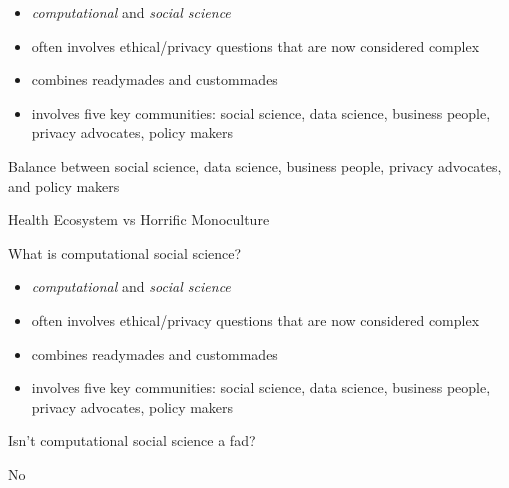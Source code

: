 \documentclass{beamer}
\def\vf{\vfill}
\begin{document}
\begin{frame}

\begin{itemize}
\item \emph{computational} and \emph{social science}
\item often involves ethical/privacy questions that are now considered complex
\item combines readymades and custommades
\pause
\item involves five key communities: social science, data science, business people, privacy advocates, policy makers
\end{itemize}

\end{frame}
\begin{frame}

\begin{center}
Balance between social science, data science, business people, privacy advocates, and policy makers\\
\end{center}
\vf
\begin{center}
Health Ecosystem vs Horrific Monoculture
\end{center}

\end{frame}
\begin{frame}

\begin{center}
\LARGE{What is computational social science?}
\end{center}

\begin{itemize}
\item \emph{computational} and \emph{social science}
\item often involves ethical/privacy questions that are now considered complex
\item combines readymades and custommades
\item involves five key communities: social science, data science, business people, privacy advocates, policy makers
\end{itemize}

\end{frame}
\begin{frame}

\begin{center}
\LARGE{Isn't computational social science a fad?}
\end{center}

\pause

No

\end{frame}
\end{document}
